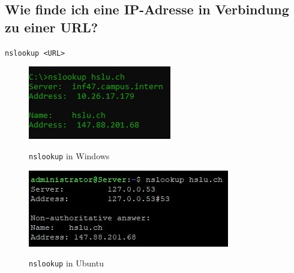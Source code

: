 \subsection*{Wie finde ich eine IP-Adresse in Verbindung zu einer URL?}
\begin{multicols}{2}
    \texttt{nslookup <URL>}
    \begin{figure}[H]
        \begin{center}
        \label{pic:nslookup_win{Sprungmarke}}
        \includegraphics[width=.5\textwidth]{images/nslookup_win.jpg}
        \caption{\texttt{nslookup} in Windows}
        \end{center}
    \end{figure}
    \columnbreak
    \vfill\null
    \begin{figure}[H]
        \begin{center}
        \label{pic:nslookup_unix}
        \includegraphics[width=.5\textwidth]{images/nslookup_unix.jpg}
        \caption{\texttt{nslookup} in Ubuntu}
        \end{center}
    \end{figure}
\end{multicols}

\pagebreak
